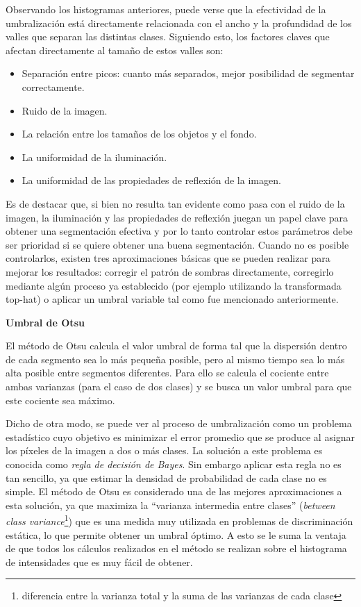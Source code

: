 Observando los histogramas anteriores, puede verse que la efectividad de la umbralización está directamente relacionada con el ancho y la profundidad de los valles que separan las distintas clases. Siguiendo esto, los factores claves que afectan directamente al tamaño de estos valles son:
\begin{itemize}
\item Separación entre picos: cuanto más separados, mejor posibilidad de segmentar correctamente.
\item Ruido de la imagen.
\item La relación entre los tamaños de los objetos y el fondo.
\item La uniformidad de la iluminación.
\item La uniformidad de las propiedades de reflexión de la imagen.
\end{itemize}

Es de destacar que, si bien no resulta tan evidente como pasa con el ruido de la imagen, la iluminación y las propiedades de reflexión juegan un papel clave para obtener una segmentación efectiva y por lo tanto controlar estos parámetros debe ser prioridad si se quiere obtener una buena segmentación. Cuando no es posible controlarlos, existen tres aproximaciones básicas que se pueden realizar para mejorar los resultados: corregir el patrón de sombras directamente, corregirlo mediante algún proceso ya establecido (por ejemplo utilizando la transformada top-hat\cite{tophat}) o aplicar un umbral variable tal como fue mencionado anteriormente.

\vspace{10 mm}
\textbf{Umbral de Otsu}

El método de Otsu\cite{otsu} calcula el valor umbral de forma tal que la dispersión dentro de cada segmento sea lo más pequeña posible, pero al mismo tiempo sea lo más alta posible entre segmentos diferentes. Para ello se calcula el cociente entre ambas varianzas (para el caso de dos clases) y se busca un valor umbral para que este cociente sea máximo.

Dicho de otra modo, se puede ver al proceso de umbralización como un problema estadístico cuyo objetivo es minimizar el error promedio que se produce al asignar los píxeles de la imagen a dos o más clases. La solución a este problema es conocida como \textit{regla de decisión de Bayes\cite{bayes}}. Sin embargo aplicar esta regla no es tan sencillo, ya que estimar la densidad de probabilidad de cada clase no es simple. El método de Otsu\cite{otsu} es considerado una de las mejores aproximaciones a esta solución, ya que maximiza la ``varianza intermedia entre clases'' (\textit{between class variance}\footnote{diferencia entre la varianza total y la suma de las varianzas de cada clase\cite{betweenvarianze}}) que es una medida muy utilizada en problemas de discriminación estática, lo que permite obtener un umbral óptimo. A esto se le suma la ventaja de que todos los cálculos realizados en el método se realizan sobre el histograma de intensidades que es muy fácil de obtener.


